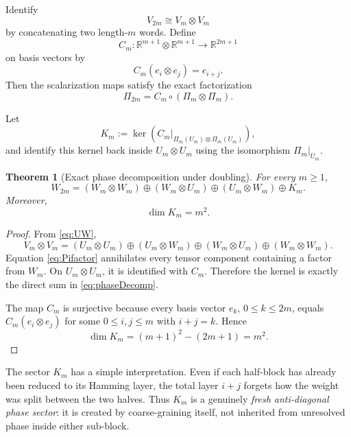 \documentclass[11pt,a4paper]{article}
\newtheorem{theorem}{Theorem}[section]
\theoremstyle{definition}
\theoremstyle{remark}
\newcommand{\R}{\mathbb R}
\begin{document}
Identify
\[
 V_{2m}\cong V_m\otimes V_m
\]
by concatenating two length-\(m\) words.  Define
\[
 C_m:\R^{m+1}\otimes\R^{m+1}\to\R^{2m+1}
\]
on basis vectors by
\begin{equation}
 C_m(e_i\otimes e_j)=e_{i+j}.
 \label{eq:Cm}
\end{equation}
Then the scalarization maps satisfy the exact factorization
\begin{equation}
 \boxed{
 \Pi_{2m}=C_m\circ(\Pi_m\otimes\Pi_m).
 }
 \label{eq:Pifactor}
\end{equation}

Let
\begin{equation}
 K_m:=\ker\left(C_m|_{\Pi_m(U_m)\otimes\Pi_m(U_m)}\right),
 \label{eq:Km}
\end{equation}
and identify this kernel back inside \(U_m\otimes U_m\) using the isomorphism
\(\Pi_m|_{U_m}\).

\begin{theorem}[Exact phase decomposition under doubling]
\label{thm:doublingdecomp}
For every \(m\ge1\),
\begin{equation}
\boxed{
W_{2m}
=(W_m\otimes W_m)
\oplus(W_m\otimes U_m)
\oplus(U_m\otimes W_m)
\oplus K_m.
}
\label{eq:phaseDecomp}
\end{equation}
Moreover,
\begin{equation}
 \boxed{\dim K_m=m^2.}
 \label{eq:Kdim}
\end{equation}
\end{theorem}

\begin{proof}
From \eqref{eq:UW},
\[
V_m\otimes V_m
=(U_m\otimes U_m)\oplus(U_m\otimes W_m)
\oplus(W_m\otimes U_m)\oplus(W_m\otimes W_m).
\]
Equation \eqref{eq:Pifactor} annihilates every tensor component containing a
factor from \(W_m\).  On \(U_m\otimes U_m\), it is identified with \(C_m\).
Therefore the kernel is exactly the direct sum in \eqref{eq:phaseDecomp}.

The map \(C_m\) is surjective because every basis vector \(e_k\),
\(0\le k\le2m\), equals \(C_m(e_i\otimes e_j)\) for some
\(0\le i,j\le m\) with \(i+j=k\).  Hence
\[
 \dim K_m=(m+1)^2-(2m+1)=m^2.
\]
\end{proof}

The sector \(K_m\) has a simple interpretation.  Even if each half-block has
already been reduced to its Hamming layer, the total layer \(i+j\) forgets how
the weight was split between the two halves.  Thus \(K_m\) is a genuinely
\emph{fresh anti-diagonal phase sector}: it is created by coarse-graining itself,
not inherited from unresolved phase inside either sub-block.
\end{document}
